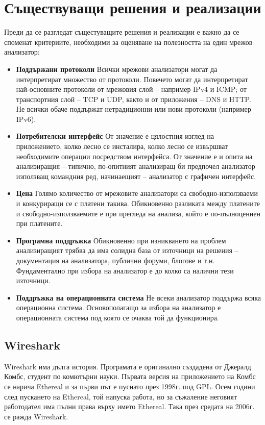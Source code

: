 \documentclass[12pt,a4paper,oneside]{book}
\begin{document}
\section{Съществуващи решения и реализации}

Преди да се разгледат същестуващите решения и реализации е важно да се споменат
критериите, необходими за оценяване на полезността на един мрежов анализатор:

\begin{itemize}
  \item \textbf{Поддържани протоколи} Всички мрежови анализатори могат да
    интерпретират множество от протоколи. Повечето могат да интерпретират
    най-основните протоколи от мрежовия слой -- например IPv4 и ICMP; от
    транспортния слой -- TCP и UDP, както и от приложения -- DNS и HTTP.
    Не всички обаче поддържат нетрадиционни или нови протоколи (например IPv6).
  \item \textbf{Потребителски интерфейс} От значение е цялостния изглед на
    приложението, колко лесно се инсталира, колко лесно се извършват
    необходимите операции посредством интерфейса. От значение е и опита на
    анализиращия -- типично, по-опитният анализиращ би предпочел анализатор
    използващ командния ред, начинаещият -- анализатор с графичен интерфейс.
  \item \textbf{Цена} Голямо количество от мрежовите анализатори са
    свободно-използваеми и конкуриращи се с платени такива. Обикновенно
    разликата между платените и свободно-използваемите е при прегледа на
    анализа, който е по-пълноценнен при платените.
  \item \textbf{Програмна поддръжка} Обикновенно при изникването на проблем
    анализиращият трябва да има солидна база от източници на решения --
    документация на анализатора, публични форуми, блогове и т.н. Фундаментално
    при избора на анализатор е до колко са налични тези източници.
  \item \textbf{Поддръжка на операционната система} Не всеки анализатор поддържа
    всяка операционна система. Основополагащо за избора на анализатор е
    операционната система под която се очаква той да функционира.
\end{itemize}


\subsection{Wireshark}

Wireshark има дълга история. Програмата е оригинално създадена от Джералд Комбс,
студент по комютърни науки. Първата версия на приложението на Комбс се нарича
Ethereal и за първи път е пуснато през 1998г. под GPL. Осем
години след пускането на Ethereal, той напуска работа, но за съжаление
неговият работодател има пълни права върху името Ethereal. Така през средата на
2006г. се ражда Wireshark.
\end{document}
